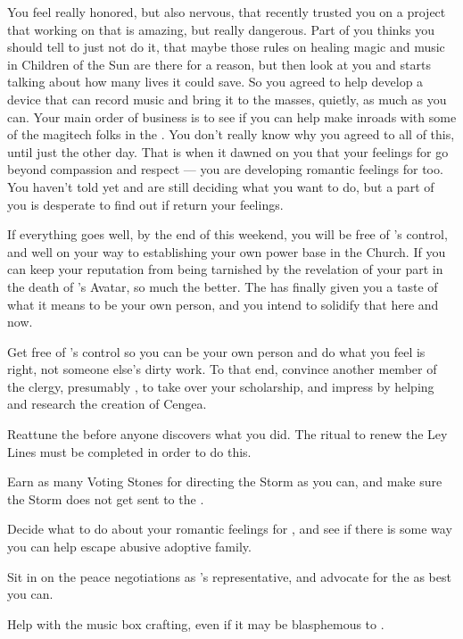 \documentclass[char]{GL2020}
\begin{document}
You feel really honored, but also nervous, that recently \cAdopted{\they} trusted you on a project that \cAdopted{\theyare} working on that is amazing, but really dangerous. Part of you thinks you should tell \cAdopted{} to just not do it, that maybe those rules on healing magic and music in Children of the Sun are there for a reason, but then \cAdopted{\they} look\cAdopted{\verbs} at you and starts talking about how many lives it could save. So you agreed to help \cAdopted{\them} develop a device that can record music and bring it to the masses, quietly, as much as you can. Your main order of business is to see if you can help \cAdopted{} make inroads with some of the magitech folks in the \pTech{}. You don’t really know why you agreed to all of this, until just the other day. That is when it dawned on you that your feelings for \cAdopted{} go beyond compassion and respect — you are developing romantic feelings for \cAdopted{\them} too. You haven't told \cAdopted{} yet and are still deciding what you want to do, but a part of you is desperate to find out if \cAdopted{\they} return your feelings.

If everything goes well, by the end of this weekend, you will be free of \cAntiChup{}'s control, and well on your way to establishing your own power base in the Church. If you can keep your reputation from being tarnished by the revelation of your part in the death of \cEbb{}'s Avatar, so much the better. The \pSchool{} has finally given you a taste of what it means to be your own person, and you intend to solidify that here and now.

\begin{itemz}
    \item Get free of \cAntiChup{}’s control so you can be your own person and do what you feel is right, not someone else’s dirty work. To that end, convince another member of the \pTech{} clergy, presumably \cBeetle{}, to take over your scholarship, and impress \cBeetle{} by helping \cEbbPriest{} and \cHeadScientist{} research the creation of Cengea.
    \item Reattune the \iScythe{} before anyone discovers what you did. The ritual to renew the Ley Lines must be completed in order to do this.
    \item Earn as many Voting Stones for directing the Storm as you can, and make sure the Storm does not get sent to the \pTech{}.
    \item Decide what to do about your romantic feelings for \cAdopted{}, and see if there is some way you can help \cAdopted{\them} escape \cAdopted{\their} abusive adoptive family.
    \item Sit in on the peace negotiations as \cAntiChup{}'s representative, and advocate for the \pTech{} as best you can.  
    \item Help \cAdopted{} with the music box \cAdopted{\theyare} crafting, even if it may be blasphemous to \cFarmGod{}.
\end{itemz}
\end{document}
